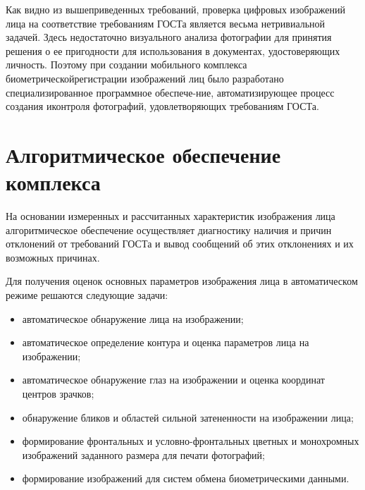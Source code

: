 \begin{multicols}{2}
Как видно из вышеприведенных требований, проверка цифровых изображений лица на соответствие требованиям ГОСТа 
является весьма нетривиальной задачей. Здесь недостаточно визуального анализа фотографии для принятия решения о\linebreak 
ее  пригодности для использования в документах,
 удос\-то\-ве\-ря\-ющих личность. Поэтому при создании
 мобильного комплекса 
биометрической\linebreak регистрации изображений лиц было разработано специ\-ализированное программное обеспече-\linebreak ние, 
автоматизирующее процесс создания и\linebreak контроля фотографий, удовлетворяющих требованиям \mbox{ГОСТа}.

\section{Алгоритмическое обеспечение комплекса}

На основании измеренных и рассчитанных характеристик изображения лица алгоритмическое обеспечение осуществляет 
диагностику наличия и причин отклонений от требований ГОСТа и вывод сообщений об этих отклонениях и их возможных 
причинах.

Для получения оценок основных параметров изображения лица в автоматическом режиме решаются следующие задачи:
\begin{itemize}
\item автоматическое обнаружение лица на изображении;
\item автоматическое определение контура и оценка параметров лица на изображении;
\item автоматическое обнаружение глаз на изображении и оценка координат центров зрачков;
\item обнаружение бликов и областей сильной затененности на изображении лица;
\item формирование фронтальных и условно-фрон\-таль\-ных цветных и монохромных изображений заданного размера для печати 
фотографий;
\item формирование изображений для систем обмена биометрическими данными.
\end{itemize}


\end{multicols}
